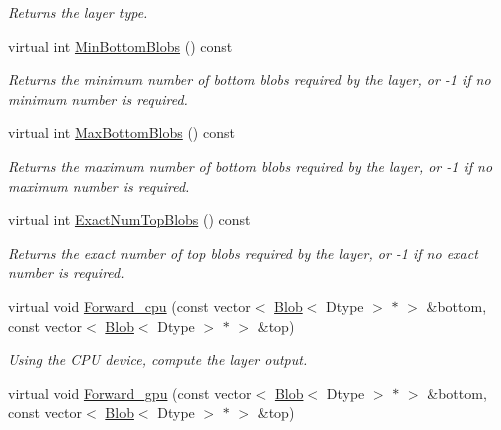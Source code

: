 \begin{DoxyCompactItemize}
\begin{DoxyCompactList}\small\item\em Returns the layer type. \end{DoxyCompactList}\item 
virtual int \hyperlink{classcaffe_1_1BiasLayer_aafd8821a1dd5a649ece00c1f0b41ff1a}{Min\+Bottom\+Blobs} () const 
\begin{DoxyCompactList}\small\item\em Returns the minimum number of bottom blobs required by the layer, or -\/1 if no minimum number is required. \end{DoxyCompactList}\item 
virtual int \hyperlink{classcaffe_1_1BiasLayer_ac8c6e5a34a6a4ca1585e41ce6f01dab5}{Max\+Bottom\+Blobs} () const 
\begin{DoxyCompactList}\small\item\em Returns the maximum number of bottom blobs required by the layer, or -\/1 if no maximum number is required. \end{DoxyCompactList}\item 
virtual int \hyperlink{classcaffe_1_1BiasLayer_a62bf10551992b95ecd499f1ce50f9465}{Exact\+Num\+Top\+Blobs} () const 
\begin{DoxyCompactList}\small\item\em Returns the exact number of top blobs required by the layer, or -\/1 if no exact number is required. \end{DoxyCompactList}\item 
virtual void \hyperlink{classcaffe_1_1BiasLayer_a168a9381f352e88e62ca7dd12f1bdfb3}{Forward\+\_\+cpu} (const vector$<$ \hyperlink{classcaffe_1_1Blob}{Blob}$<$ Dtype $>$ $\ast$ $>$ \&bottom, const vector$<$ \hyperlink{classcaffe_1_1Blob}{Blob}$<$ Dtype $>$ $\ast$ $>$ \&top)\hypertarget{classcaffe_1_1BiasLayer_a168a9381f352e88e62ca7dd12f1bdfb3}{}\label{classcaffe_1_1BiasLayer_a168a9381f352e88e62ca7dd12f1bdfb3}

\begin{DoxyCompactList}\small\item\em Using the C\+PU device, compute the layer output. \end{DoxyCompactList}\item 
virtual void \hyperlink{classcaffe_1_1BiasLayer_a4040f9ddceaac10f0e90b3e73cc6403c}{Forward\+\_\+gpu} (const vector$<$ \hyperlink{classcaffe_1_1Blob}{Blob}$<$ Dtype $>$ $\ast$ $>$ \&bottom, const vector$<$ \hyperlink{classcaffe_1_1Blob}{Blob}$<$ Dtype $>$ $\ast$ $>$ \&top)\hypertarget{classcaffe_1_1BiasLayer_a4040f9ddceaac10f0e90b3e73cc6403c}{}\label{classcaffe_1_1BiasLayer_a4040f9ddceaac10f0e90b3e73cc6403c}


\end{DoxyCompactItemize}
